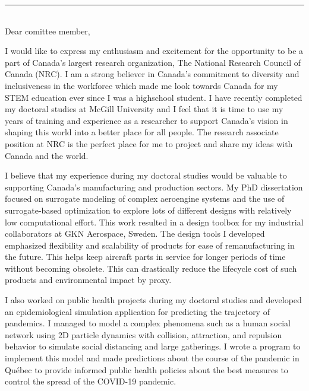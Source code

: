 \documentclass[12pt]{article} %
\begin{document}
\begin{paracol}{2}
\end{paracol}

\medskip %
\rule[0pt]{\textwidth}{1pt}\\

Dear comittee member,

\medskip %
I would like to express my enthusiasm and excitement for the opportunity to be a part of Canada's largest research organization, The National Research Council of Canada (NRC). I am a strong believer in Canada's commitment to diversity and inclusiveness in the workforce which made me look towards Canada for my STEM education ever since I was a highschool student. I have recently completed my doctoral studies at McGill University and I feel that it is time to use my years of training and experience as a researcher to support Canada's vision in shaping this world into a better place for all people. The research associate position at NRC is the perfect place for me to project and share my ideas with Canada and the world.

\medskip %

I believe that my experience during my doctoral studies would be valuable to supporting Canada's manufacturing and production sectors. My PhD dissertation focused on surrogate modeling of complex aeroengine systems and the use of surrogate-based optimization to explore lots of different designs with relatively low computational effort. This work resulted in a design toolbox for my industrial collaborators at GKN Aerospace, Sweden. The design tools I developed emphasized flexibility and scalability of products for ease of remanufacturing in the future. This helps keep aircraft parts in service for longer periods of time without becoming obsolete. This can drastically reduce the lifecycle cost of such products and environmental impact by proxy.

\medskip %

I also worked on public health projects during my doctoral studies and developed an epidemiological simulation application for predicting the trajectory of pandemics. I managed to model a complex phenomena such as a human social network using 2D particle dynamics with collision, attraction, and repulsion behavior to simulate social distancing and large gatherings. I wrote a program to implement this model and made predictions about the course of the pandemic in Qu{\'e}bec to provide informed public health policies about the best measures to control the spread of the COVID-19 pandemic.
\end{document}
